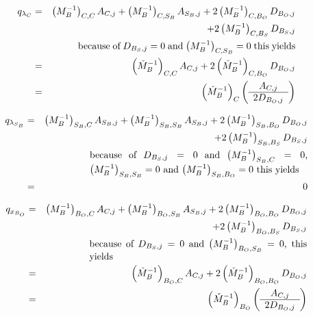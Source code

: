 \documentclass[a4paper]{article}
\begin{document}
\begin{eqnarray}
\label{eq:q_C}
q_{\lambda_{C}}
&=&
\left(M_{B}^{-1}\right)_{C,C}A_{C,j}
+\left(M_{B}^{-1}\right)_{C, S_{B}}A_{S_{B}, j}
+2\left(M_{B}^{-1}\right)_{C, B_{O}}D_{B_{O}, j}
\nonumber \\
&&
+2\left(M_{B}^{-1}\right)_{C, B_{S}}D_{B_{S}, j}
\nonumber \\
&&\begin{minipage}{8cm}
because of $D_{B_{S},j}=0$ and $\left(M_{B}^{-1}\right)_{C, S_{B}}=0$ this
yields
\end{minipage}
\nonumber \\
&=&
\left(\check{M}_{B}^{-1}\right)_{C,C}A_{C,j}
+2\left(\check{M}_{B}^{-1}\right)_{C, B_{O}}D_{B_{O}, j}
\nonumber \\
&=&
\left(\check{M}_{B}^{-1}\right)_{C}
\left(\begin{array}{c}
        A_{C, j} \\
	\hline
	2D_{B_{O}, j}
      \end{array}
\right)       
\end{eqnarray}

\begin{eqnarray}
q_{\lambda_{S_{B}}}
&=&
\left(M_{B}^{-1}\right)_{S_{B},C}A_{S_{B},j}
+\left(M_{B}^{-1}\right)_{S_{B}, S_{B}}A_{S_{B}, j}
+2\left(M_{B}^{-1}\right)_{S_{B}, B_{O}}D_{B_{O}, j}
\nonumber \\
&&
+2\left(M_{B}^{-1}\right)_{S_{B}, B_{S}}D_{B_{S}, j}
\nonumber \\
&&\begin{minipage}{8cm}
because of $D_{B_{S},j}=0$ and $\left(M_{B}^{-1}\right)_{S_{B}, C}=0$,
$\left(M_{B}^{-1}\right)_{S_{B}, S_{B}}=0$ and 
$\left(M_{B}^{-1}\right)_{S_{B}, B_{O}}=0$
this yields
\end{minipage}
\nonumber \\
&=&
0
\end{eqnarray}

\begin{eqnarray}
\label{eq:q_B_O}
q_{x_{B_{O}}}
&=&
\left(M_{B}^{-1}\right)_{B_{O},C}A_{C,j}
+\left(M_{B}^{-1}\right)_{B_{O}, S_{B}}A_{S_{B}, j}
+2\left(M_{B}^{-1}\right)_{B_{O}, B_{O}}D_{B_{O}, j}
\nonumber \\
&&
+2\left(M_{B}^{-1}\right)_{B_{O}, B_{S}}D_{B_{S}, j}
\nonumber \\
&&\begin{minipage}{8cm}
because of $D_{B_{S},j}=0$ and $\left(M_{B}^{-1}\right)_{B_{O}, S_{B}}=0$,
this yields
\end{minipage}
\nonumber \\
&=&
\left(\check{M}_{B}^{-1}\right)_{B_{O}, C}A_{C,j}
+2\left(\check{M}_{B}^{-1}\right)_{B_{O}, B_{O}}D_{B_{O}, j}
\nonumber \\
&=&
\left(\check{M}_{B}^{-1}\right)_{B_{O}}
\left(\begin{array}{c}
        A_{C, j} \\
	\hline
	2D_{B_{O}, j}
      \end{array}
\right)       
\end{eqnarray}
\end{document}
